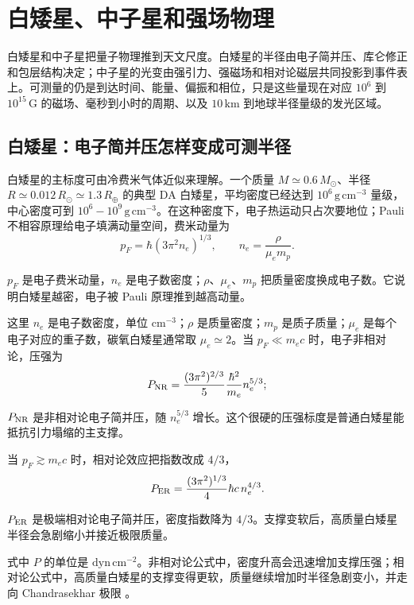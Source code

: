 \chapter{白矮星、中子星和强场物理}
\label{chap:11}

\begin{chapteropening}
白矮星和中子星把量子物理推到天文尺度。白矮星的半径由电子简并压、库仑修正和包层结构决定；中子星的光变由强引力、强磁场和相对论磁层共同投影到事件表上。可测量的仍是到达时间、能量、偏振和相位，只是这些量现在对应 \(10^6\) 到 \(10^{15}\,\mathrm{G}\) 的磁场、毫秒到小时的周期、以及 \(10\,\mathrm{km}\) 到地球半径量级的发光区域。
\end{chapteropening}

\section{白矮星：电子简并压怎样变成可测半径}

白矮星的主标度可由冷费米气体近似来理解。一个质量 \(M\simeq 0.6\,M_\odot\)、半径 \(R\simeq 0.012\,R_\odot\simeq 1.3\,R_\oplus\) 的典型 DA 白矮星，平均密度已经达到 \(10^6\,\mathrm{g\,cm^{-3}}\) 量级，中心密度可到 \(10^6-10^9\,\mathrm{g\,cm^{-3}}\)。在这种密度下，电子热运动只占次要地位；Pauli 不相容原理给电子填满动量空间，费米动量为
\begin{equation}
  p_F=\hbar (3\pi^2 n_e)^{1/3}, \qquad n_e=\frac{\rho}{\mu_e m_p}.
  \label{eq:ch11-01}
\end{equation}
\begin{formulaexplain}
\(p_F\) 是电子费米动量，\(n_e\) 是电子数密度；\(\rho\)、\(\mu_e\)、\(m_p\) 把质量密度换成电子数。它说明白矮星越密，电子被 Pauli 原理推到越高动量。
\end{formulaexplain}
这里 \(n_e\) 是电子数密度，单位 \(\mathrm{cm^{-3}}\)；\(\rho\) 是质量密度；\(m_p\) 是质子质量；\(\mu_e\) 是每个电子对应的重子数，碳氧白矮星通常取 \(\mu_e\simeq2\)。当 \(p_F\ll m_e c\) 时，电子非相对论，压强为
\begin{equation}
  P_{\rm NR}=\frac{(3\pi^2)^{2/3}}{5}\frac{\hbar^2}{m_e}n_e^{5/3};
  \label{eq:ch11-02}
\end{equation}
\begin{formulaexplain}
\(P_{\rm NR}\) 是非相对论电子简并压，随 \(n_e^{5/3}\) 增长。这个很硬的压强标度是普通白矮星能抵抗引力塌缩的主支撑。
\end{formulaexplain}
当 \(p_F\gtrsim m_e c\) 时，相对论效应把指数改成 \(4/3\)，
\begin{equation}
  P_{\rm ER}=\frac{(3\pi^2)^{1/3}}{4}\hbar c\, n_e^{4/3}.
  \label{eq:ch11-03}
\end{equation}
\begin{formulaexplain}
\(P_{\rm ER}\) 是极端相对论电子简并压，密度指数降为 \(4/3\)。支撑变软后，高质量白矮星半径会急剧缩小并接近极限质量。
\end{formulaexplain}
式中 \(P\) 的单位是 \(\mathrm{dyn\,cm^{-2}}\)。非相对论公式中，密度升高会迅速增加支撑压强；相对论公式中，高质量白矮星的支撑变得更软，质量继续增加时半径急剧变小，并走向 Chandrasekhar 极限 \citep{1931ApJ....74...81C,1935MNRAS..95..207C,1961ApJ...134..683H}。

